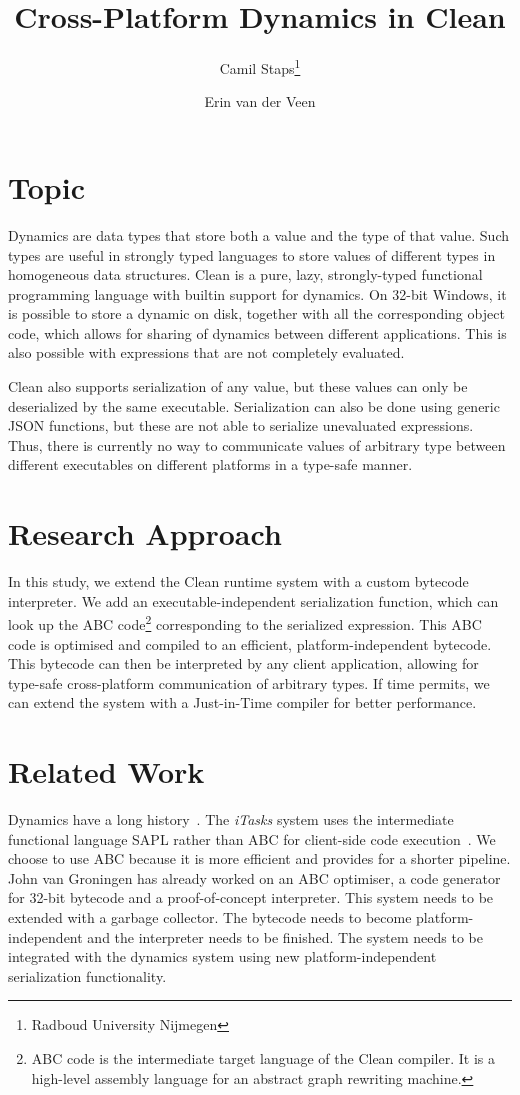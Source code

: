 \documentclass[a4paper]{article}
\title{Cross-Platform Dynamics in Clean}
\author{Camil Staps\footnote{Radboud University Nijmegen} \and Erin van der Veen\footnotemark[1]}
\begin{document}
\maketitle

\section*{Topic}
Dynamics are data types that store both a value and the type of that value.
Such types are useful in strongly typed languages to store values of different types in homogeneous data structures.
Clean is a pure, lazy, strongly-typed functional programming language with builtin support for dynamics.
On 32-bit Windows, it is possible to store a dynamic on disk, together with all the corresponding object code,
	which allows for sharing of dynamics between different applications.
This is also possible with expressions that are not completely evaluated.

Clean also supports serialization of any value, but these values can only be deserialized by the same executable.
Serialization can also be done using generic JSON functions, but these are not able to serialize unevaluated expressions.
Thus, there is currently no way to communicate values of arbitrary type between different executables on different platforms in a type-safe manner.

\section*{Research Approach}
In this study, we extend the Clean runtime system with a custom bytecode interpreter.
We add an executable-independent serialization function,
	which can look up the ABC code\footnote{ABC code is the intermediate target language of the Clean compiler. It is a high-level assembly language for an abstract graph rewriting machine.} corresponding to the serialized expression.
This ABC code is optimised and compiled to an efficient, platform-independent bytecode.
This bytecode can then be interpreted by any client application, allowing for type-safe cross-platform communication of arbitrary types.
If time permits, we can extend the system with a Just-in-Time compiler for better performance.

\section*{Related Work}
Dynamics have a long history~\cites[e.g.]{Plotkin1987,Abadi1992,Lero1993,Pil1998,VanNoort2012}.
The \emph{iTasks} system uses the intermediate functional language SAPL rather than ABC for client-side code execution~\cites{Jansen2006,Plasmeijer2008}.
We choose to use ABC because it is more efficient and provides for a shorter pipeline.
John van Groningen has already worked on an ABC optimiser, a code generator for 32-bit bytecode and a proof-of-concept interpreter.
This system needs to be extended with a garbage collector.
The bytecode needs to become platform-independent and the interpreter needs to be finished.
The system needs to be integrated with the dynamics system using new platform-independent serialization functionality.

\footnotesize
\printbibliography
\end{document}

